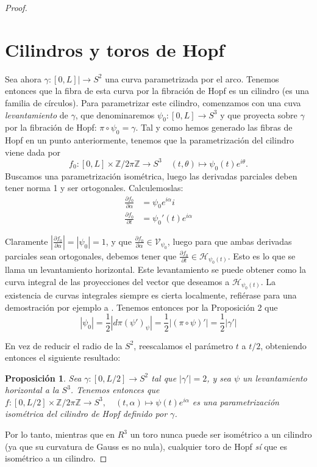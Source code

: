 \documentclass[11pt]{diazessay} %
\newtheorem{proposition}{Proposición}
\begin{document}
\begin{proof}
    \section*{Cilindros y toros de Hopf}

    Sea ahora $\gamma:[0,L]|\to S^2$ una curva parametrizada por el arco. Tenemos entonces que la fibra de esta curva por la fibración de Hopf es un cilindro (es una familia de círculos). Para parametrizar este cilindro, comenzamos con una cuva \textit{levantamiento} de $\gamma$, que denominaremos $\psi_0:[0,L]\to S^3$ y que proyecta sobre $\gamma$ por la fibración de Hopf: $\pi\circ\psi_0=\gamma$. Tal y como hemos generado las fibras de Hopf en un punto anteriormente, tenemos que la parametrización del cilindro viene dada por \[f_0:[0,L]\times \mathbb{Z}/2\pi\mathbb{Z}\to S^3\quad (t,\theta)\mapsto \psi_0(t)e^{i\theta}.\] Buscamos una parametrización isométrica, luego las derivadas parciales deben tener norma 1 y ser ortogonales. Calculemoslas:
    \begin{align*}
        \frac{\partial f_0}{\partial\alpha} & = \psi_0 e^{i\alpha} i \\
        \frac{\partial f_0}{\partial t} & = \psi_0'(t)e^{i\alpha}
    \end{align*}

    Claramente $|\frac{\partial f_0}{\partial\alpha}| = |\psi_0| = 1$, y que $\frac{\partial f_0}{\partial\alpha}\in\mathcal{V}_{\psi_0}$, luego para que ambas derivadas parciales sean ortogonales, debemos tener que $ \frac{\partial f_0}{\partial t}\in \mathcal{H}_{\psi_0(t)}$. Esto es lo que se llama un levantamiento horizontal. Este levantamiento se puede obtener como la curva integral de las proyecciones del vector que deseamos a $\mathcal{H}_{\psi_0(t)}$. La existencia de curvas integrales siempre es cierta localmente, refiérase para una demostración por ejemplo a \cite[Teorema 9.12]{Lee_2003}. Tenemos entonces por la Proposición 2 que
    \[|\psi_0| = \frac{1}{2}|d\pi(\psi')_\psi| = \frac{1}{2} |(\pi\circ\psi)'| = \frac{1}{2} |\gamma'|\]

    En vez de reducir el radio de la $S^2$, reescalamos el parámetro $t$ a $t/2$, obteniendo entonces el siguiente resultado:

    \begin{proposition}
        Sea $\gamma:[0,L/2]\to S^2$ tal que $|\gamma'|=2$, y sea $\psi$ un levantamiento horizontal a la $S^3$. Tenemos entonces que $f:[0,L/2]\times \mathbb{Z}/2\pi\mathbb{Z}\to S^3,\quad (t,\alpha)\mapsto \psi(t)e^{i\alpha}$ es una parametrización isométrica del cilindro de Hopf definido por $\gamma$.
    \end{proposition}

    Por lo tanto, mientras que en $R^3$ un toro nunca puede ser isométrico a un cilindro (ya que su curvatura de Gauss es no nula), cualquier toro de Hopf \textit{sí} que es isométrico a un cilindro.

\end{proof}




\end{document}
